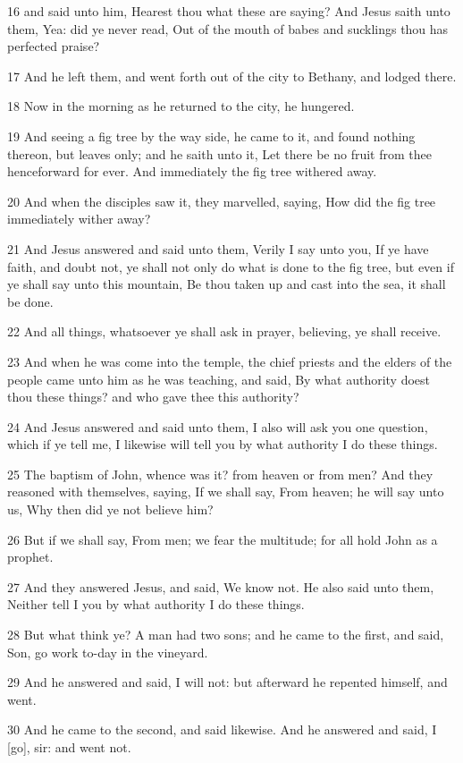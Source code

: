 \par 16 and said unto him, Hearest thou what these are saying? And Jesus saith unto them, Yea: did ye never read, Out of the mouth of babes and sucklings thou has perfected praise?
\par 17 And he left them, and went forth out of the city to Bethany, and lodged there.
\par 18 Now in the morning as he returned to the city, he hungered.
\par 19 And seeing a fig tree by the way side, he came to it, and found nothing thereon, but leaves only; and he saith unto it, Let there be no fruit from thee henceforward for ever. And immediately the fig tree withered away.
\par 20 And when the disciples saw it, they marvelled, saying, How did the fig tree immediately wither away?
\par 21 And Jesus answered and said unto them, Verily I say unto you, If ye have faith, and doubt not, ye shall not only do what is done to the fig tree, but even if ye shall say unto this mountain, Be thou taken up and cast into the sea, it shall be done.
\par 22 And all things, whatsoever ye shall ask in prayer, believing, ye shall receive.
\par 23 And when he was come into the temple, the chief priests and the elders of the people came unto him as he was teaching, and said, By what authority doest thou these things? and who gave thee this authority?
\par 24 And Jesus answered and said unto them, I also will ask you one question, which if ye tell me, I likewise will tell you by what authority I do these things.
\par 25 The baptism of John, whence was it? from heaven or from men? And they reasoned with themselves, saying, If we shall say, From heaven; he will say unto us, Why then did ye not believe him?
\par 26 But if we shall say, From men; we fear the multitude; for all hold John as a prophet.
\par 27 And they answered Jesus, and said, We know not. He also said unto them, Neither tell I you by what authority I do these things.
\par 28 But what think ye? A man had two sons; and he came to the first, and said, Son, go work to-day in the vineyard.
\par 29 And he answered and said, I will not: but afterward he repented himself, and went.
\par 30 And he came to the second, and said likewise. And he answered and said, I [go], sir: and went not.
